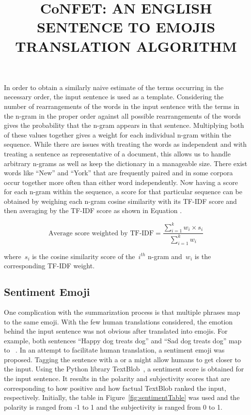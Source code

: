 \documentclass{article}[10]
\newcommand*{\img}[1]{%
  \raisebox{-.3\baselineskip}{%
    \texttt{[image: \#1]}%
  }%
} \title{{CoNFET:} AN ENGLISH SENTENCE TO EMOJIS TRANSLATION ALGORITHM}
\begin{document}
In order to obtain a similarly naive estimate of the terms occurring in the
necessary order, the input sentence is used as a template. Considering the
number of rearrangements of the words in the input sentence with the terms in
the n-gram in the proper order against all possible rearrangements of the words
gives the probability that the n-gram appears in that sentence. Multiplying both
of these values together gives a weight for each individual n-gram within the
sequence. While there are issues with treating the words as independent and with
treating a sentence as representative of a document, this allows us to handle
arbitrary n-grams as well as keep the dictionary in a manageable size. There
exist words like ``New'' and ``York'' that are frequently paired and in some
corpora occur together more often than either word independently. Now having a
score for each n-gram within the sequence, a score for that particular sequence
can be obtained by weighing each n-gram cosine similarity with its TF-IDF score
and then averaging by the TF-IDF score as shown in Equation
.

\begin{equation}
  \textrm{Average score weighted by
    TF-IDF} = \frac{\sum_{i=1}^{k}w_{i}\times s_i}{\sum_{i=1}^{k}w_{i}}\label{eq:averageTF-IDFScore}
\end{equation}

where~\(s_{i}\) is the cosine similarity score of the~\(i^{th}\) n-gram
and~\(w_{i}\) is the corresponding TF-IDF weight.

\subsection{Sentiment Emoji\label{sec:sentimentEmoji}}

One complication with the summarization process is that multiple phrases map to
the same emoji. With the few human translations considered, the emotion behind
the input sentence was not obvious after translated into emojis. For example,
both sentences ``Happy dog treats dog'' and ``Sad dog treats dog'' map
to~\img{emojis/1f415.png}\img{emojis/1f368.png}\img{emojis/1f415.png}. In an
attempt to facilitate human translation, a sentiment emoji was proposed. Tagging
the sentence with a \img{emojis/1f60a.png} or a \img{emojis/1f641.png} might
allow humans to get closer to the input. Using the Python library
TextBlob~\cite{TextBlob}, a sentiment score is obtained for the input sentence.
It results in the polarity and subjectivity scores that are corresponding to how
positive and how factual TextBlob ranked the input, respectively. Initially, the
table in Figure~\ref{fig:sentimentTable} was used and the polarity is ranged
from -1 to 1 and the subjectivity is ranged from 0 to 1.
\end{document}
